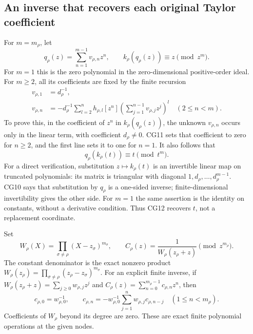 \subsection{An inverse that recovers each original Taylor coefficient}

For $m=m_\rho$, let
\begin{equation}
 q_\rho(z)=\sum_{n=1}^{m-1}v_{\rho,n}z^n,
 \qquad k_\rho(q_\rho(z))\equiv z\pmod{z^m}.
 \tag{CG10}\label{cg:inverse-coordinate}
\end{equation}
For $m=1$ this is the zero polynomial in the zero-dimensional
positive-order ideal. For $m\ge2$, all its coefficients are fixed
by the finite recursion
\begin{equation}
 \begin{split}
 v_{\rho,1}&=d_\rho^{-1},\\
 v_{\rho,n}&=-d_\rho^{-1}\sum_{l=2}^{n}h_{\rho,l}
   [z^n]\left(\sum_{j=1}^{n-1}v_{\rho,j}z^j\right)^l
                  \quad(2\le n<m).
 \end{split}
 \tag{CG11}\label{cg:inverse-recursion}
\end{equation}
To prove this, in the coefficient of $z^n$ in
$k_\rho(q_\rho(z))$, the unknown $v_{\rho,n}$ occurs only in the
linear term, with coefficient $d_\rho\ne0$. CG11 sets that
coefficient to zero for $n\ge2$, and the first line sets it to
one for $n=1$. It also follows that
\begin{equation}
 q_\rho(k_\rho(t))\equiv t\pmod{t^m}.
 \tag{CG12}\label{cg:two-sided}
\end{equation}
For a direct verification, substitution $z\mapsto k_\rho(t)$
is an invertible linear map on truncated polynomials: its matrix
is triangular with diagonal $1,d_\rho,\ldots,d_\rho^{m-1}$.
CG10 says that substitution by $q_\rho$ is a one-sided inverse;
finite-dimensional invertibility gives the other side. For $m=1$
the same assertion is the identity on constants, without a derivative
condition. Thus CG12
recovers $t$, not a replacement coordinate.

Set
\begin{equation}
 W_\rho(X)=\prod_{\sigma\ne\rho}(X-z_\sigma)^{m_\sigma},
 \qquad
 C_\rho(z)=\frac1{W_\rho(z_\rho+z)}\pmod{z^{m_\rho}}.
 \tag{CG13}\label{cg:reciprocal}
\end{equation}
The constant denominator is the exact nonzero product
$W_\rho(z_\rho)=\prod_{\sigma\ne\rho}(z_\rho-z_\sigma)^{m_\sigma}$.
For an explicit finite inverse, if
$W_\rho(z_\rho+z)=\sum_{j\ge0}w_{\rho,j}z^j$ and
$C_\rho(z)=\sum_{n=0}^{m_\rho-1}c_{\rho,n}z^n$, then
\begin{equation}
 c_{\rho,0}=w_{\rho,0}^{-1},\qquad
 c_{\rho,n}=-w_{\rho,0}^{-1}
              \sum_{j=1}^{n}w_{\rho,j}c_{\rho,n-j}
 \quad(1\le n<m_\rho).
 \tag{CG14}\label{cg:reciprocal-recursion}
\end{equation}
Coefficients of $W_\rho$ beyond its degree are zero. These are
exact finite polynomial operations at the given nodes.

